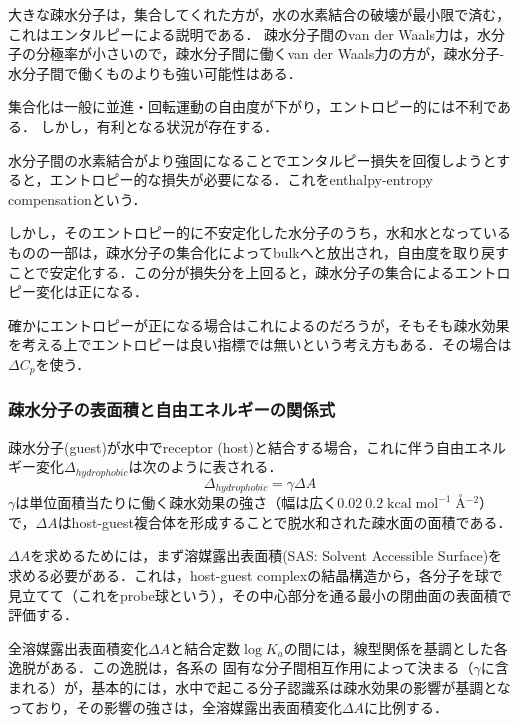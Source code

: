 \documentclass[uplatex, dvipdfmx]{jsreport}
\begin{document}
大きな疎水分子は，集合してくれた方が，水の水素結合の破壊が最小限で済む，これはエンタルピーによる説明である．
疎水分子間のvan der Waals力は，水分子の分極率が小さいので，疎水分子間に働くvan der Waals力の方が，疎水分子-水分子間で働くものよりも強い可能性はある．

集合化は一般に並進・回転運動の自由度が下がり，エントロピー的には不利である．
しかし，有利となる状況が存在する．
\begin{model}
    水分子間の水素結合がより強固になることでエンタルピー損失を回復しようとすると，エントロピー的な損失が必要になる．これをenthalpy-entropy compensationという．

    しかし，そのエントロピー的に不安定化した水分子のうち，水和水となっているものの一部は，疎水分子の集合化によってbulkへと放出され，自由度を取り戻すことで安定化する．この分が損失分を上回ると，疎水分子の集合によるエントロピー変化は正になる．
\end{model}
\begin{remark}
    確かにエントロピーが正になる場合はこれによるのだろうが，そもそも疎水効果を考える上でエントロピーは良い指標では無いという考え方もある．その場合は$\Delta C_p$を使う．
\end{remark}

\subsubsection{疎水分子の表面積と自由エネルギーの関係式}

\begin{theory}
    疎水分子(guest)が水中でreceptor (host)と結合する場合，これに伴う自由エネルギー変化$\Delta_{hydrophobic}$は次のように表される．
    \[ \Delta_{hydrophobic} = \gamma\Delta A \]
    $\gamma$は単位面積当たりに働く疎水効果の強さ（幅は広く$0.02~0.2\;\mathrm{kcal\;mol^{-1}\;\overset{\circ}{A}\!{}^{-2}}$）で，$\Delta A$はhost-guest複合体を形成することで脱水和された疎水面の面積である．

    $\Delta A$を求めるためには，まず溶媒露出表面積(SAS: Solvent Accessible Surface)を求める必要がある．これは，host-guest complexの結晶構造から，各分子を球で見立てて（これをprobe球という），その中心部分を通る最小の閉曲面の表面積で評価する．

    全溶媒露出表面積変化$\Delta A$と結合定数$\log K_a$の間には，線型関係を基調とした各逸脱がある．この逸脱は，各系の
    固有な分子間相互作用によって決まる（$\gamma$に含まれる）が，基本的には，水中で起こる分子認識系は疎水効果の影響が基調となっており，その影響の強さは，全溶媒露出表面積変化$\Delta A$に比例する．
\end{theory}
\end{document}
